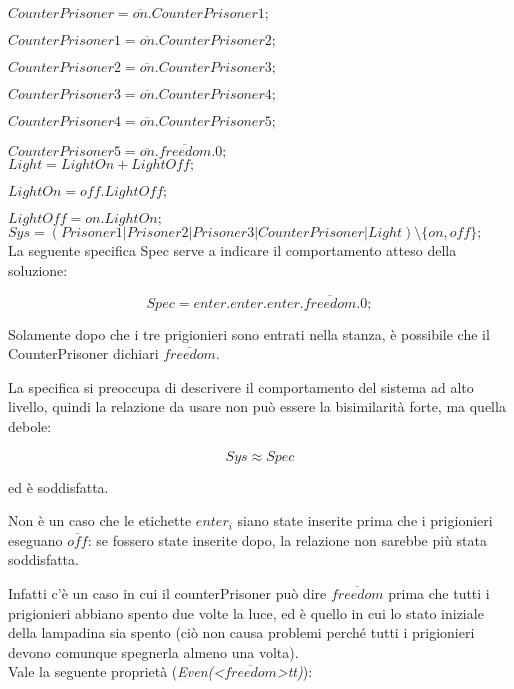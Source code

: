 $CounterPrisoner = \overline{on}.CounterPrisoner1;$

$CounterPrisoner1 = \overline{on}.CounterPrisoner2;$

$CounterPrisoner2 = \overline{on}.CounterPrisoner3;$

$CounterPrisoner3 = \overline{on}.CounterPrisoner4;$

$CounterPrisoner4 = \overline{on}.CounterPrisoner5;$

$CounterPrisoner5 = \overline{on}.\overline{freedom}.0;$ \\

$Light = LightOn + LightOff;$

$LightOn = off.LightOff;$

$LightOff = on.LightOn;$ \\

$Sys = (Prisoner1 | Prisoner2 | Prisoner3 | CounterPrisoner | Light) \setminus \{on, off\};$ \\

La seguente specifica Spec serve a indicare il comportamento atteso della
soluzione:

\begin{equation*}
Spec = enter.enter.enter.\overline{freedom}.0;
\end{equation*}

Solamente dopo che i tre prigionieri sono entrati nella stanza, è possibile che
il CounterPrisoner dichiari $\overline{freedom}$.

La specifica si preoccupa di descrivere il comportamento del sistema ad alto
livello, quindi la relazione da usare non può essere la bisimilarità forte, ma
quella debole:

\begin{equation*}
Sys \approx Spec
\end{equation*}

ed è soddisfatta.

Non è un caso che le etichette $enter_i$ siano state inserite prima che i
prigionieri eseguano $\overline{off}$: se fossero state inserite dopo, la 
relazione non sarebbe più stata soddisfatta.

Infatti c'è un caso in cui il counterPrisoner può dire $\overline{freedom}$
prima che tutti i prigionieri abbiano spento due volte la luce, ed è quello
in cui lo stato iniziale della lampadina sia spento (ciò non causa problemi
perché tutti i prigionieri devono comunque spegnerla almeno una volta). \\

Vale la seguente proprietà (\textit{Even(<$\overline{freedom}$>tt)}):

